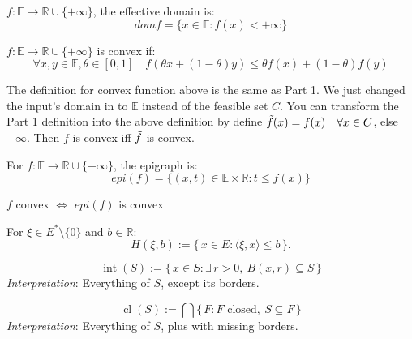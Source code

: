 \documentclass[11pt,a4paper]{article}
\begin{document}
\begin{defbox}
$f: \mathds{E} \rightarrow \mathds{R} \cup \{+\infty\}$, the effective domain is:
\[
domf = \{x \in \mathds{E}: f(x) < +\infty\}
\]
\end{defbox}

\begin{defbox}
$f: \mathds{E} \rightarrow \mathds{R} \cup \{+\infty\}$ is convex if:
\[
\forall x,y \in \mathds{E}, \theta \in [0,1] \quad f(\theta x + (1 - \theta)y) \le \theta f(x) + (1-\theta)f(y)
\]
\end{defbox}

\begin{notebox}
The definition for convex function above is the same as Part 1. We just changed the input's domain in to $\mathds{E}$ instead of the feasible set $C$. You can transform the Part 1 definition into the above definition by define $\Tilde{f}(x) = f(x) \quad \forall x \in C$, else $+\infty$. Then $f$ is convex iff $\Tilde{f}$ is convex.
\end{notebox}

\begin{defbox}[(Epigraph)]
For $f: \mathds{E} \rightarrow \mathds{R} \cup \{+\infty\}$, the epigraph is:
\[
epi(f) = \{(x,t) \in \mathds{E} \times \mathds{R}: t \le f(x)\}
\]
\end{defbox}

\begin{thmbox}
$f$ convex $\Leftrightarrow$ $epi(f)$ is convex
\end{thmbox}


\begin{defbox}
For $\xi \in E^* \setminus \{0\}$ and $b \in \mathbb{R}$:
\[
H(\xi, b) := \{\, x \in E : \langle \xi, x \rangle \le b \,\}.
\]
\end{defbox}

\begin{defbox}[(Interior)]
\[
\operatorname{int}(S) := \{\, x \in S : \exists\, r > 0,\ B(x, r) \subseteq S \,\}
\]
\textit{Interpretation}: Everything of $S$, except its borders.
\end{defbox}

\begin{defbox}[(Closure)]
 \[
 \operatorname{cl}(S) := \bigcap \{\, F : F \text{ closed},\ S \subseteq F \,\}
 \]
 \textit{Interpretation}: Everything of $S$, plus with missing borders.
\end{defbox}
\end{document}
